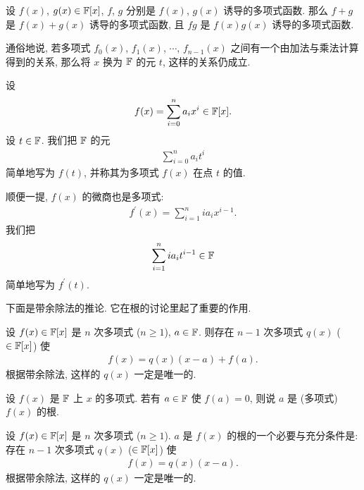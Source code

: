 \begin{proposition}
    设 $f(x)$, $g(x) \in \mathbb{F}[x]$, $f$, $g$ 分别是 $f(x)$, $g(x)$ 诱导的多项式函数. 那么 $f+g$ 是 $f(x)+g(x)$ 诱导的多项式函数, 且 $fg$ 是 $f(x)g(x)$ 诱导的多项式函数.

    通俗地说, 若多项式 $f_0 (x)$, $f_1 (x)$, $\cdots$, $f_{n-1} (x)$ 之间有一个由加法与乘法计算得到的关系, 那么将 $x$ 换为 $\mathbb{F}$ 的元 $t$, 这样的关系仍成立.
\end{proposition}

\begin{definition}
    设
    \begin{align*}
        f(x) = \sum_{i=0}^n a_i x^i \in \mathbb{F}[x].
    \end{align*}
    设 $t \in \mathbb{F}$. 我们把 $\mathbb{F}$ 的元
    \begin{align*}
        \sum_{i=0}^n a_i t^i
    \end{align*}
    简单地写为 $f(t)$, 并称其为多项式 $f(x)$ 在点 $t$ 的值.

    顺便一提, $f(x)$ 的微商也是多项式:
    \begin{align*}
        f^{\prime} (x) = \sum_{i = 1}^{n} i a_i x^{i - 1}.
    \end{align*}
    我们把
    \begin{align*}
        \sum_{i = 1}^{n} i a_i t^{i - 1} \in \mathbb{F}
    \end{align*}
    简单地写为 $f^{\prime} (t)$.
\end{definition}

下面是带余除法的推论. 它在根的讨论里起了重要的作用.

\begin{proposition}
    设 $f(x) \in \mathbb{F}[x]$ 是 $n$ 次多项式 ($n \geq 1$), $a \in \mathbb{F}$. 则存在 $n-1$ 次多项式 $q(x)$ ($\in \mathbb{F}[x]$) 使
    \begin{align*}
        f(x) = q(x) (x-a) + f(a).
    \end{align*}
    根据带余除法, 这样的 $q(x)$ 一定是唯一的.
\end{proposition}

\begin{definition}
    设 $f(x)$ 是 $\mathbb{F}$ 上 $x$ 的多项式. 若有 $a \in \mathbb{F}$ 使 $f(a) = 0$, 则说 $a$ 是 (多项式) $f(x)$ 的根.
\end{definition}

\begin{proposition}
    设 $f(x) \in \mathbb{F}[x]$ 是 $n$ 次多项式 ($n \geq 1$). $a$ 是 $f(x)$ 的根的一个必要与充分条件是: 存在 $n-1$ 次多项式 $q(x)$ ($\in \mathbb{F}[x]$) 使
    \begin{align*}
        f(x) = q(x) (x-a).
    \end{align*}
    根据带余除法, 这样的 $q(x)$ 一定是唯一的.
\end{proposition}

